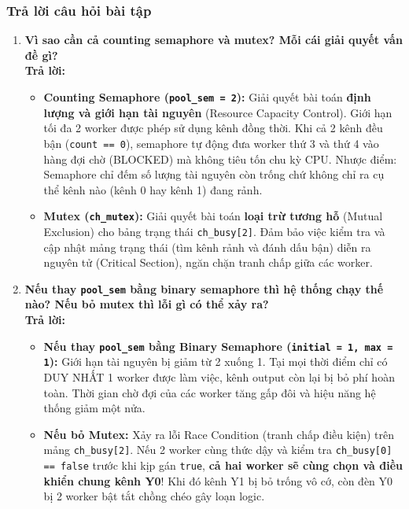 \subsubsection{Trả lời câu hỏi bài tập}
\begin{enumerate}[label=(\alph*)]
    \item \textbf{Vì sao cần cả counting semaphore và mutex? Mỗi cái giải quyết vấn đề gì?} \\
    \textbf{Trả lời:}
    \begin{itemize}
        \item \textbf{Counting Semaphore (\texttt{pool\_sem = 2}):} Giải quyết bài toán \textbf{định lượng và giới hạn tài nguyên} (Resource Capacity Control). Giới hạn tối đa 2 worker được phép sử dụng kênh đồng thời. Khi cả 2 kênh đều bận (\texttt{count == 0}), semaphore tự động đưa worker thứ 3 và thứ 4 vào hàng đợi chờ (BLOCKED) mà không tiêu tốn chu kỳ CPU. Nhược điểm: Semaphore chỉ đếm số lượng tài nguyên còn trống chứ không chỉ ra cụ thể kênh nào (kênh 0 hay kênh 1) đang rảnh.
        \item \textbf{Mutex (\texttt{ch\_mutex}):} Giải quyết bài toán \textbf{loại trừ tương hỗ} (Mutual Exclusion) cho bảng trạng thái \texttt{ch\_busy[2]}. Đảm bảo việc kiểm tra và cập nhật mảng trạng thái (tìm kênh rảnh và đánh dấu bận) diễn ra nguyên tử (Critical Section), ngăn chặn tranh chấp giữa các worker.
    \end{itemize}
    
    \item \textbf{Nếu thay \texttt{pool\_sem} bằng binary semaphore thì hệ thống chạy thế nào? Nếu bỏ mutex thì lỗi gì có thể xảy ra?} \\
    \textbf{Trả lời:}
    \begin{itemize}
        \item \textbf{Nếu thay \texttt{pool\_sem} bằng Binary Semaphore (\texttt{initial = 1, max = 1}):} Giới hạn tài nguyên bị giảm từ 2 xuống 1. Tại mọi thời điểm chỉ có DUY NHẤT 1 worker được làm việc, kênh output còn lại bị bỏ phí hoàn toàn. Thời gian chờ đợi của các worker tăng gấp đôi và hiệu năng hệ thống giảm một nửa.
        \item \textbf{Nếu bỏ Mutex:} Xảy ra lỗi Race Condition (tranh chấp điều kiện) trên mảng \texttt{ch\_busy[2]}. Nếu 2 worker cùng thức dậy và kiểm tra \texttt{ch\_busy[0] == false} trước khi kịp gán \texttt{true}, \textbf{cả hai worker sẽ cùng chọn và điều khiển chung kênh Y0}! Khi đó kênh Y1 bị bỏ trống vô cớ, còn đèn Y0 bị 2 worker bật tắt chồng chéo gây loạn logic.
    \end{itemize}
    

\end{enumerate}
